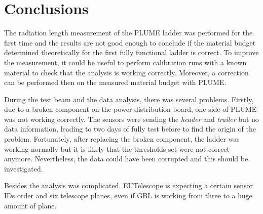 






   \begin{figure}
     \centering
     \label{fig:X0vsP}
   \end{figure}


  \section{Conclusions}

  The radiation length measurement of the \gls{PLUME} ladder was performed for the first time and the results are not good enough to conclude if the material budget determined theoretically for the first fully functional ladder is correct.
  To improve the measurement, it could be useful to perform calibration runs with a known material to check that the analysis is working correctly.
  Moreover, a correction can be performed then on the measured material budget with \gls{PLUME}.

  During the test beam and the data analysis, there was several problems.
  Firstly, due to a broken component on the power distribution board, one side of \gls{PLUME} was not working correctly.
  The sensors were sending the \textit{header} and \textit{trailer} but no data information, leading to two days of fully test before to find the origin of the problem.
  Fortunately, after replacing the broken component, the ladder was working normally but it is likely that the thresholds set were not correct anymore.
  Nevertheless, the data could have been corrupted and this should be investigated.

  Besides the analysis was complicated.
  EUTelescope is expecting a certain sensor IDs order and six telescope planes, even if \gls{GBL} is working from three to a huge amount of plane.
